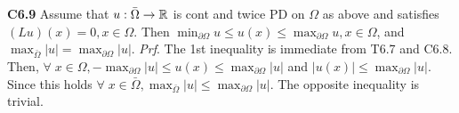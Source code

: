 {\bf C6.9} Assume that $u: \bar{\Omega} \rightarrow \mathbb{R}$ is cont and twice PD on $\Omega$ as above and satisfies $(Lu)(x) = 0, x \in \Omega$. Then $\min_{\partial \Omega}u \leq u(x) \leq  \max_{\partial \Omega} u, x \in \Omega$, and $\max_{\bar{\Omega}}|u| = \max_{\partial \Omega} |u|$. {\it Prf}. The 1st inequality is immediate from T6.7 and C6.8. Then, $\forall \; x\in \Omega, - \max_{\partial \Omega} |u| \leq u(x) \leq  \max_{\partial \Omega} |u|$ and $|u(x)| \leq  \max_{\partial \Omega} |u|$. Since this holds $\forall \; x \in \bar{\Omega}, \max_{\bar{\Omega}} |u| \leq  \max_{\partial \Omega} |u|$.  The opposite inequality is trivial. 
